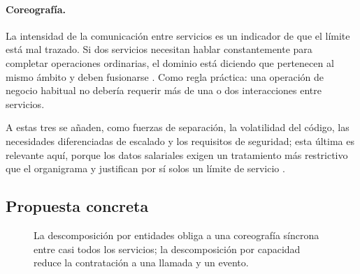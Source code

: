 \paragraph{Coreografía.} La intensidad de la comunicación entre servicios es un indicador de que el límite está mal trazado. Si dos servicios necesitan hablar constantemente para completar operaciones ordinarias, el dominio está diciendo que pertenecen al mismo ámbito y deben fusionarse \parencite{fordhardparts2021}. Como regla práctica: una operación de negocio habitual no debería requerir más de una o dos interacciones entre servicios.

A estas tres se añaden, como fuerzas de separación, la volatilidad del código, las necesidades diferenciadas de escalado y los requisitos de seguridad; esta última es relevante aquí, porque los datos salariales exigen un tratamiento más restrictivo que el organigrama y justifican por sí solos un límite de servicio \parencite{fordhardparts2021}.

\subsection{Propuesta concreta}

\begin{figure}[h]
\centering
{}
\caption{La descomposición por entidades obliga a una coreografía síncrona entre casi todos los servicios; la descomposición por capacidad reduce la contratación a una llamada y un evento.}
\end{figure}


